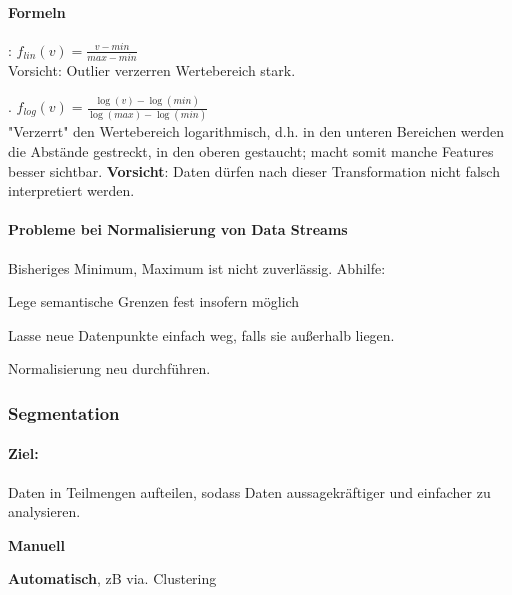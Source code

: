 \documentclass[10pt]{article} %
\begin{document}
\paragraph{Formeln} 
\begin{cptitemize} 
 	 \item {}: $f_{lin}(v) = \frac{v-min}{max-min}$ \\
 	 Vorsicht: Outlier verzerren Wertebereich stark.
 	 \item {}. $f_{log}(v) = \frac{\log(v)-\log(min)}{\log(max)-\log(min)}$ \\
 	 "Verzerrt" den Wertebereich logarithmisch, d.h. in den unteren Bereichen werden die Abstände gestreckt, in den oberen gestaucht; macht somit manche Features besser sichtbar. \textbf{Vorsicht}: Daten dürfen nach dieser Transformation nicht falsch interpretiert werden.
\end{cptitemize} 

\paragraph{Probleme bei Normalisierung von Data Streams} Bisheriges Minimum, Maximum ist nicht zuverlässig. Abhilfe:
\begin{cptitemize} 
 	 \item Lege semantische Grenzen fest insofern möglich  
 	 \item Lasse neue Datenpunkte einfach weg, falls sie außerhalb liegen.
 	 \item Normalisierung neu durchführen.
\end{cptitemize} 


\subsubsection{Segmentation}

\paragraph{Ziel:} Daten in Teilmengen aufteilen, sodass Daten aussagekräftiger und einfacher zu analysieren. 

\begin{cptitemize} 
      \item \textbf{Manuell}
      \item \textbf{Automatisch}, zB via. Clustering 
\end{cptitemize} 
\end{document}
